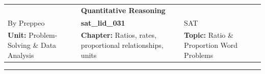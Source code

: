 \documentclass[11pt,paper=a4,answers]{exam}
\begin{document}
\begin{center}
    \centering
    \renewcommand{\arraystretch}{1.5}
    \begin{tabularx}{\textwidth}{YYY}
    & \normalsize\bf{{\Large{{Quantitative Reasoning}}}} & \\
    By Preppeo & \normalsize\bf{{sat\_lid\_031}} & SAT\\
    \normalsize{{\textbf{{Unit:}} Problem-Solving \& Data Analysis}} & \normalsize{{\textbf{{Chapter:}} Ratios, rates, proportional relationships, units}} & \normalsize{{\textbf{{Topic:}} Ratio \& Proportion Word Problems}} \\
    \end{tabularx}
\end{center}
\par\noindent\rule{\textwidth}{1pt}
\end{document}
